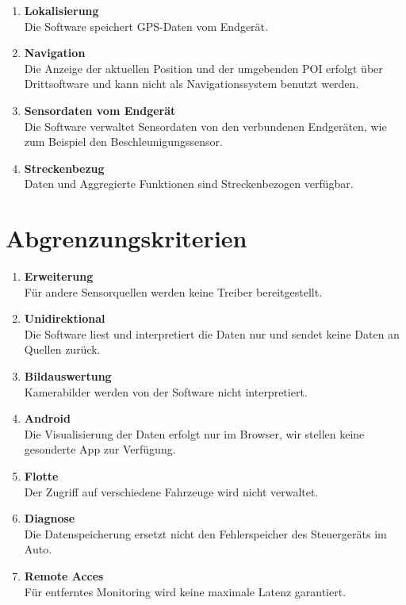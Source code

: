 \documentclass[pflichtenheft.tex]{subfiles}
\begin{document}
\begin{enumerate}
	\item{\textbf{Lokalisierung}}\\Die Software speichert GPS-Daten vom Endgerät.

	\item{\textbf{Navigation}}\\Die Anzeige der aktuellen Position und der umgebenden POI erfolgt über Drittsoftware und kann nicht als Navigationssystem benutzt werden.

	\item{\textbf{Sensordaten vom Endgerät}}\\Die Software verwaltet Sensordaten von den verbundenen Endgeräten, wie zum Beispiel den Beschleunigungssensor.

	\item{\textbf{Streckenbezug}} \\Daten und Aggregierte Funktionen sind Streckenbezogen verfügbar.

\end{enumerate}

\renewcommand{\theenumi}{/AK\ifnum \value{enumi}<10 0\fi\arabic{enumi}0/}
\renewcommand{\labelenumi}{\theenumi}
\renewcommand{\theenumii}{\arabic{enumii}}
\renewcommand{\labelenumii}{/AK\ifnum \value{enumi}<10 0\fi\arabic{enumi}\arabic{enumii}/}

\section{Abgrenzungskriterien}

\begin{enumerate}
	\item{\textbf{Erweiterung}} \\Für andere Sensorquellen werden keine Treiber bereitgestellt.

	\item{\textbf{Unidirektional}} \\Die Software liest und interpretiert die Daten nur und sendet keine Daten an Quellen zurück.

	\item{\textbf{Bildauswertung}} \\Kamerabilder werden von der Software nicht interpretiert.

	\item{\textbf{Android}} \\Die Visualisierung der Daten erfolgt nur im Browser, wir stellen keine gesonderte App zur Verfügung.

	\item{\textbf{Flotte}} \\Der Zugriff auf verschiedene Fahrzeuge wird nicht verwaltet.


	\item{\textbf{Diagnose}} \\Die Datenspeicherung ersetzt nicht den Fehlerspeicher des Steuergeräts im Auto.

	\item{\textbf{Remote Acces}} \\Für entferntes Monitoring wird keine maximale Latenz garantiert.

\end{enumerate}
\end{document}
